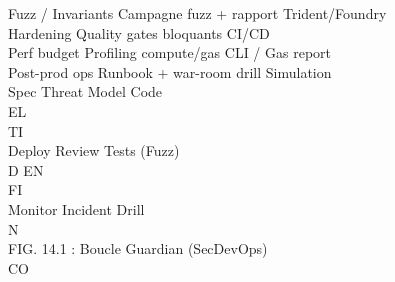 \documentclass[12pt,landscape,a4paper]{article}
\begin{document}
Fuzz / Invariants Campagne fuzz + rapport           Trident/Foundry\\
Hardening         Quality gates bloquants           CI/CD\\
Perf budget       Profiling compute/gas             CLI / Gas report\\
Post-prod ops     Runbook + war-room drill          Simulation\\
\vspace{0.5em}
\vspace{0.5em}
\vspace{0.5em}
Spec             Threat Model              Code\\
\vspace{0.5em}
\vspace{0.5em}
\vspace{0.5em}
\vspace{0.5em}
EL\\
TI\\
Deploy             Review             Tests (Fuzz)\\
\vspace{0.5em}
\vspace{0.5em}
\vspace{0.5em}
\vspace{0.5em}
D    EN\\
FI\\
Monitor             Incident Drill\\
\vspace{0.5em}
\vspace{0.5em}
N\\
FIG. 14.1 : Boucle Guardian (SecDevOps)\\
CO\\
\vspace{0.5em}
\end{document}
